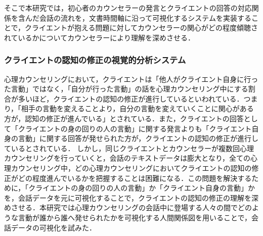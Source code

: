 \documentclass[shuuron]{kuee}
\begin{document}
そこで本研究では，初心者のカウンセラーの発言とクライエントの回答の対応関係を含んだ会話の流れを，文書時間軸に沿って可視化するシステムを実装することで，クライエントが抱える問題に対してカウンセラーの関心がどの程度傾聴されているかについてカウンセラーにより理解を深めさせる．






\subsubsection{クライエントの認知の修正の視覚的分析システム}


心理カウンセリングにおいて，クライエントは「他人がクライエント自身に行った言動」ではなく，「自分が行った言動」の話を心理カウンセリング中にする割合が多いほど，クライエントの認知の修正が進行しているといわれている．つまり，「相手の言動を変えることより，自分の言動を変えていくことに関心がある方が，認知の修正が進んでいる」\cite{zokad}とされている．また，クライエントの回答として「クライエントの身の回りの人の言動」に関する発言よりも「クライエント自身の言動」に関する回答が発せられた方が，クライエントの認知の修正が進行しているとされている．
しかし，同じクライエントとカウンセラーが複数回心理カウンセリングを行っていくと，会話のテキストデータは膨大となり，全ての心理カウンセリング中，どの心理カウンセリングにおいてクライエントの認知の修正がどの程度進んでいるかを把握することは困難になる．この問題を解決するために，「クライエントの身の回りの人の言動」か「クライエント自身の言動」かを，会話データを元に可視化することで，クライエントの認知の修正の理解を深めさせる．本研究では心理カウンセリングの会話中に登場する人々の間でどのような言動が誰から誰へ発せられたかを可視化する人間関係図を用いることで，会話データの可視化を試みた．
\end{document}
